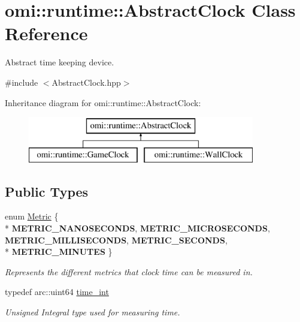 \hypertarget{classomi_1_1runtime_1_1_abstract_clock}{}\section{omi\+:\+:runtime\+:\+:Abstract\+Clock Class Reference}
\label{classomi_1_1runtime_1_1_abstract_clock}


Abstract time keeping device.  




{\ttfamily \#include $<$Abstract\+Clock.\+hpp$>$}

Inheritance diagram for omi\+:\+:runtime\+:\+:Abstract\+Clock\+:\begin{figure}[H]
\begin{center}
\leavevmode
\includegraphics[height=2.000000cm]{classomi_1_1runtime_1_1_abstract_clock}
\end{center}
\end{figure}
\subsection*{Public Types}
\begin{DoxyCompactItemize}
\item 
enum \hyperlink{classomi_1_1runtime_1_1_abstract_clock_a6af6e30a02165469ffcdcbd512d47a1b}{Metric} \{ \\*
{\bfseries M\+E\+T\+R\+I\+C\+\_\+\+N\+A\+N\+O\+S\+E\+C\+O\+N\+DS}, 
{\bfseries M\+E\+T\+R\+I\+C\+\_\+\+M\+I\+C\+R\+O\+S\+E\+C\+O\+N\+DS}, 
{\bfseries M\+E\+T\+R\+I\+C\+\_\+\+M\+I\+L\+L\+I\+S\+E\+C\+O\+N\+DS}, 
{\bfseries M\+E\+T\+R\+I\+C\+\_\+\+S\+E\+C\+O\+N\+DS}, 
\\*
{\bfseries M\+E\+T\+R\+I\+C\+\_\+\+M\+I\+N\+U\+T\+ES}
 \}\hypertarget{classomi_1_1runtime_1_1_abstract_clock_a6af6e30a02165469ffcdcbd512d47a1b}{}\label{classomi_1_1runtime_1_1_abstract_clock_a6af6e30a02165469ffcdcbd512d47a1b}
\begin{DoxyCompactList}\small\item\em Represents the different metrics that clock time can be measured in. \end{DoxyCompactList}
\item 
typedef arc\+::uint64 \hyperlink{classomi_1_1runtime_1_1_abstract_clock_af2122541388aea885afc08e8135340f7}{time\+\_\+int}\hypertarget{classomi_1_1runtime_1_1_abstract_clock_af2122541388aea885afc08e8135340f7}{}\label{classomi_1_1runtime_1_1_abstract_clock_af2122541388aea885afc08e8135340f7}

\begin{DoxyCompactList}\small\item\em Unsigned Integral type used for measuring time. \end{DoxyCompactList}\end{DoxyCompactItemize}
